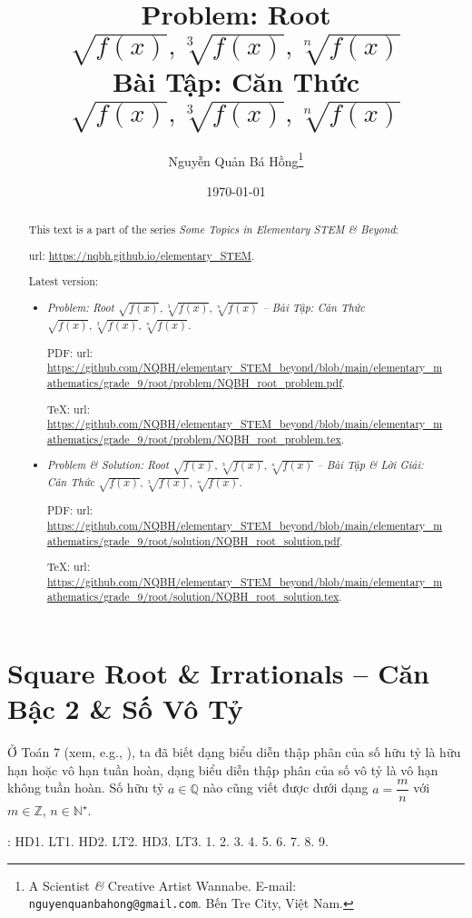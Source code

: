 \documentclass{article}
\title{Problem: Root $\sqrt{f(x)},\sqrt[3]{f(x)},\sqrt[n]{f(x)}$\\Bài Tập: Căn Thức $\sqrt{f(x)},\sqrt[3]{f(x)},\sqrt[n]{f(x)}$}
\author{Nguyễn Quản Bá Hồng\footnote{A Scientist {\it\&} Creative Artist Wannabe. E-mail: {\tt nguyenquanbahong@gmail.com}. Bến Tre City, Việt Nam.}}
\date{\today}
\begin{document}
\maketitle
\begin{abstract}
	This text is a part of the series {\it Some Topics in Elementary STEM \& Beyond}:
	
	{\sc url}: \url{https://nqbh.github.io/elementary_STEM}.
	
	Latest version:
	\begin{itemize}
		\item {\it Problem: Root $\sqrt{f(x)},\sqrt[3]{f(x)},\sqrt[n]{f(x)}$ -- Bài Tập: Căn Thức $\sqrt{f(x)},\sqrt[3]{f(x)},\sqrt[n]{f(x)}$}.
		
		PDF: {\sc url}: \url{https://github.com/NQBH/elementary_STEM_beyond/blob/main/elementary_mathematics/grade_9/root/problem/NQBH_root_problem.pdf}.
		
		\TeX: {\sc url}: \url{https://github.com/NQBH/elementary_STEM_beyond/blob/main/elementary_mathematics/grade_9/root/problem/NQBH_root_problem.tex}.
		\item {\it Problem \& Solution: Root $\sqrt{f(x)},\sqrt[3]{f(x)},\sqrt[n]{f(x)}$ -- Bài Tập \& Lời Giải: Căn Thức $\sqrt{f(x)},\sqrt[3]{f(x)},\sqrt[n]{f(x)}$}.
		
		PDF: {\sc url}: \url{https://github.com/NQBH/elementary_STEM_beyond/blob/main/elementary_mathematics/grade_9/root/solution/NQBH_root_solution.pdf}.
		
		\TeX: {\sc url}: \url{https://github.com/NQBH/elementary_STEM_beyond/blob/main/elementary_mathematics/grade_9/root/solution/NQBH_root_solution.tex}.
	\end{itemize}
\end{abstract}
\tableofcontents


\section{Square Root \& Irrationals -- Căn Bậc 2 \& Số Vô Tỷ}
Ở Toán 7 (xem, e.g., \cite[\S5, pp. 27--29]{SGK_Toan_7_Canh_Dieu_tap_1}), ta đã biết dạng biểu diễn thập phân của số hữu tỷ là hữu hạn hoặc vô hạn tuần hoàn, dạng biểu diễn thập phân của số vô tỷ là vô hạn không tuần hoàn. Số hữu tỷ $a\in\mathbb{Q}$ nào cũng viết được dưới dạng $a = \dfrac{m}{n}$ với $m\in\mathbb{Z}$, $n\in\mathbb{N}^\star$.

\noindent\cite[Chap. III, \S1, pp. 48--54]{SGK_Toan_9_Canh_Dieu_tap_1}: HD1. LT1. HD2. LT2. HD3. LT3. 1. 2. 3. 4. 5. 6. 7. 8. 9.
\end{document}
